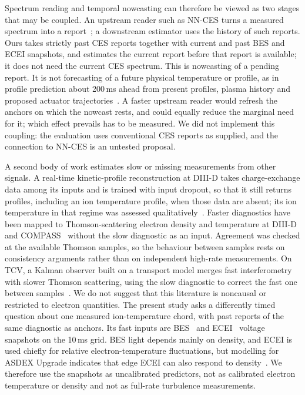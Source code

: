 Spectrum reading and temporal nowcasting can therefore be viewed as two stages that may be coupled. An upstream reader such as NN-CES turns a measured spectrum into a report~\citep{Lee2026NeuralNetworkbased}; a downstream estimator uses the history of such reports. Ours takes strictly past CES reports together with current and past BES and ECEI snapshots, and estimates the current report before that report is available; it does not need the current CES spectrum. This is nowcasting of a pending report. It is not forecasting of a future physical temperature or profile, as in profile prediction about 200\,ms ahead from present profiles, plasma history and proposed actuator trajectories~\citep{Abbate2021DatadrivenProfile}. A faster upstream reader would refresh the anchors on which the nowcast rests, and could equally reduce the marginal need for it; which effect prevails has to be measured. We did not implement this coupling: the evaluation uses conventional CES reports as supplied, and the connection to NN-CES is an untested proposal.

A second body of work estimates slow or missing measurements from other signals. A real-time kinetic-profile reconstruction at DIII-D takes charge-exchange data among its inputs and is trained with input dropout, so that it still returns profiles, including an ion temperature profile, when those data are absent; its ion temperature in that regime was assessed qualitatively~\citep{Shousha2023MachineLearningbased}. Faster diagnostics have been mapped to Thomson-scattering electron density and temperature at DIII-D~\citep{Jalalvand2025MultimodalSuperresolution} and COMPASS~\citep{Imrek2026TemporalSuperresolution} without the slow diagnostic as an input. Agreement was checked at the available Thomson samples, so the behaviour between samples rests on consistency arguments rather than on independent high-rate measurements. On TCV, a Kalman observer built on a transport model merges fast interferometry with slower Thomson scattering, using the slow diagnostic to correct the fast one between samples~\citep{Pastore2023ModelBased}. We do not suggest that this literature is noncausal or restricted to electron quantities. The present study asks a differently timed question about one measured ion-temperature chord, with past reports of the same diagnostic as anchors. Its fast inputs are BES~\citep{Lampert2015CombinedHydrogen} and ECEI~\citep{Yun2014Quasi3d} voltage snapshots on the 10\,ms grid. BES light depends mainly on density, and ECEI is used chiefly for relative electron-temperature fluctuations, but modelling for ASDEX Upgrade indicates that edge ECEI can also respond to density~\citep{Vanovac2018EffectsDensity}. We therefore use the snapshots as uncalibrated predictors, not as calibrated electron temperature or density and not as full-rate turbulence measurements.

